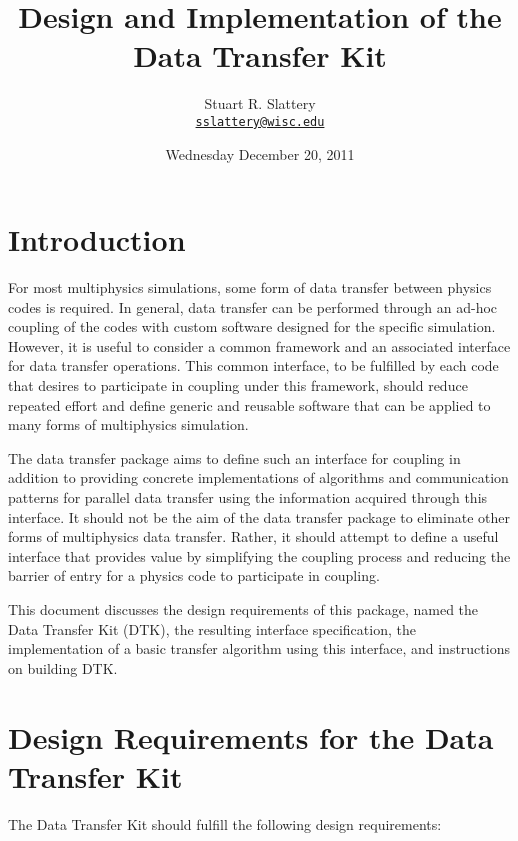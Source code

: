 \documentclass[letterpaper]{article}
\author{Stuart R. Slattery
  \\ \href{mailto:sslattery@wisc.edu}{\texttt{sslattery@wisc.edu}}
}
\date{Wednesday December 20, 2011}
\title{Design and Implementation of the Data Transfer Kit}
\begin{document}
\maketitle

\section{Introduction}
For most multiphysics simulations, some form of data transfer between
physics codes is required. In general, data transfer can be performed
through an ad-hoc coupling of the codes with custom software designed
for the specific simulation. However, it is useful to consider a
common framework and an associated interface for data transfer
operations. This common interface, to be fulfilled by each code that
desires to participate in coupling under this framework, should reduce
repeated effort and define generic and reusable software that can be
applied to many forms of multiphysics simulation.

The data transfer package aims to define such an interface for coupling in
addition to providing concrete implementations of algorithms and
communication patterns for parallel data transfer using the
information acquired through this interface. It should not be the aim
of the data transfer package to eliminate other forms of multiphysics
data transfer. Rather, it should attempt to define a useful interface
that provides value by simplifying the coupling process and reducing
the barrier of entry for a physics code to participate in coupling. 

This document discusses the design requirements of this package, named
the Data Transfer Kit (DTK), the resulting interface specification,
the implementation of a basic transfer algorithm using this interface,
and instructions on building DTK.

\section{Design Requirements for the Data Transfer Kit}
The Data Transfer Kit should fulfill the following design
requirements:
\end{document}
